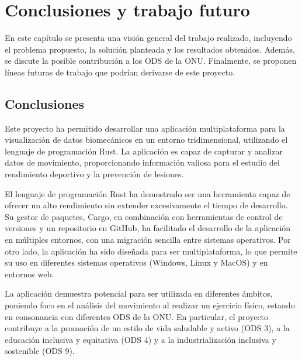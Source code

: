 \chapter{Conclusiones y trabajo futuro} \label{sec:cap6}

\noindent En este capítulo se presenta una visión general del trabajo realizado, incluyendo el problema propuesto, la solución planteada y los resultados obtenidos. Además, se discute la posible contribución a los \ac{ODS} de la ONU. Finalmente, se proponen líneas futuras de trabajo que podrían derivarse de este proyecto.

\section{Conclusiones}

Este proyecto ha permitido desarrollar una aplicación multiplataforma para la visualización de datos biomecánicos en un entorno tridimensional, utilizando el lenguaje de programación Rust. La aplicación es capaz de capturar y analizar datos de movimiento, proporcionando información valiosa para el estudio del rendimiento deportivo y la prevención de lesiones.

El lenguaje de programación Rust ha demostrado ser una herramienta capaz de ofrecer un alto rendimiento sin extender excesivamente el tiempo de desarrollo. Su gestor de paquetes, Cargo, en combinación con herramientas de control de versiones y un repositorio en GitHub, ha facilitado el desarrollo de la aplicación en múltiples entornos, con una migración sencilla entre sistemas operativos. Por otro lado, la aplicación ha sido diseñada para ser multiplataforma, lo que permite su uso en diferentes sistemas operativos (Windows, Linux y MacOS) y en entornos web.

La aplicación demuestra potencial para ser utilizada en diferentes ámbitos, poniendo foco en el análisis del movimiento al realizar un ejercicio físico, estando en consonancia con diferentes \ac{ODS} de la ONU. En particular, el proyecto contribuye a la promoción de un estilo de vida saludable y activo (\ac{ODS} 3), a la educación inclusiva y equitativa (\ac{ODS} 4) y a la industrialización inclusiva y sostenible (\ac{ODS} 9).

